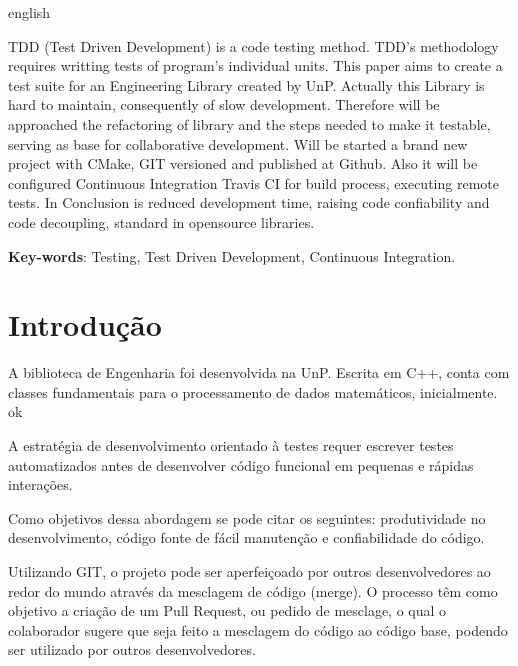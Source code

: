 \documentclass[
	article,			%
	12pt,				%
	oneside,			%
	a4paper,			%
	english,			
	brazil,
	sumario=tradicional
	]{abntex2}
\begin{document}
\begin{resumo}[Abstract]
 \begin{otherlanguage*}{english}
	
	TDD (Test Driven Development) is a code testing method. TDD's methodology requires writting tests of program's individual units. This paper aims to create a test suite for an Engineering Library created by UnP. Actually this Library is hard to maintain, consequently of slow development. Therefore will be approached the refactoring of library and the steps needed to make it testable, serving as base for collaborative development. Will be started a brand new project with CMake, GIT versioned and published at Github. Also it will be configured Continuous Integration Travis CI for build process, executing remote tests. In Conclusion is reduced development time, raising code confiability and code decoupling, standard in opensource libraries.
   \vspace{\onelineskip}
 
   \noindent 
   \textbf{Key-words}: Testing, Test Driven Development, Continuous Integration.
 \end{otherlanguage*}
\end{resumo}

\textual

\section*{Introdução}

A biblioteca de Engenharia foi desenvolvida na UnP. Escrita em C++, conta com classes fundamentais para o processamento de dados matemáticos, inicialmente. \cite{consolaro1996carie} ok

A estratégia de desenvolvimento orientado à testes requer escrever testes automatizados antes de desenvolver código funcional em pequenas e rápidas interações. \cite{testdrivendevelopment.1}

Como objetivos dessa abordagem se pode citar os seguintes: produtividade no desenvolvimento,
código fonte de fácil manutenção e confiabilidade do código.

Utilizando GIT, o projeto pode ser aperfeiçoado por outros desenvolvedores ao redor do mundo através da mesclagem de código (merge). O processo têm como objetivo a criação de um Pull Request, ou pedido de mesclage, o qual o colaborador sugere que seja feito a mesclagem do código ao código base, podendo ser utilizado por outros desenvolvedores.
\end{document}
